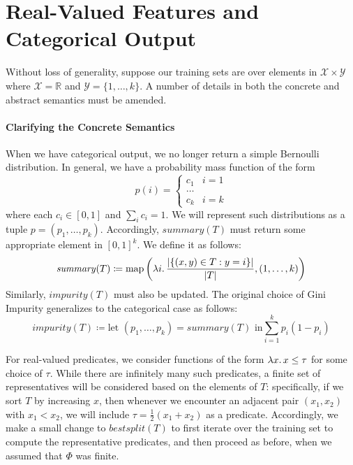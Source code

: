 \section{Real-Valued Features and Categorical Output}

Without loss of generality, suppose our training sets are over elements in
$\mathcal{X} \times \mathcal{Y}$ where
$\mathcal{X} = \mathbb{R}$ and $\mathcal{Y} = \{1, \ldots, k\}$.
A number of details in both the concrete and abstract semantics must be amended.


\paragraph{Clarifying the Concrete Semantics}

When we have categorical output, we no longer return a simple Bernoulli distribution.
In general, we have a probability mass function of the form
\[
    p(i) = \begin{cases}
        c_1 & i = 1 \\
        \ldots \\
        c_k & i = k
    \end{cases}
\]
where each $c_i \in [0, 1]$ and $\sum_{i} c_i = 1$.
We will represent such distributions as a tuple $p = (p_1, \ldots, p_k)$.
Accordingly, $\mathit{summary}(T)$ must return some appropriate element in $[0,1]^k$.
We define it as follows:
\[
    \mathit{summary}(T) \coloneqq
    \text{map} \left(\lambda i \ldotp \frac{\lvert\{(x,y) \in T : y = i\}\rvert}{|T|},
    (1,\ldots,k) \right)
\]
Similarly, $\mathit{impurity}(T)$ must also be updated.
The original choice of Gini Impurity generalizes to the categorical case as follows:
\[
    \mathit{impurity}(T) \coloneqq
    \text{let } (p_1, \ldots, p_k) = \mathit{summary}(T) \text{ in}
    \sum_{i=1}^k p_i (1 - p_i)
\]

For real-valued predicates, we consider functions of the form
$\lambda x \ldotp x \leq \tau$ for some choice of $\tau$.
While there are infinitely many such predicates, a finite set of representatives
will be considered based on the elements of $T$:
specifically, if we sort $T$ by increasing $x$,
then whenever we encounter an adjacent pair $(x_1, x_2)$ with $x_1 < x_2$,
we will include $\tau = \frac{1}{2}(x_1 + x_2)$ as a predicate.
Accordingly, we make a small change to $\mathit{bestsplit}(T)$
to first iterate over the training set to compute the representative predicates,
and then proceed as before, when we assumed that $\Phi$ was finite.


